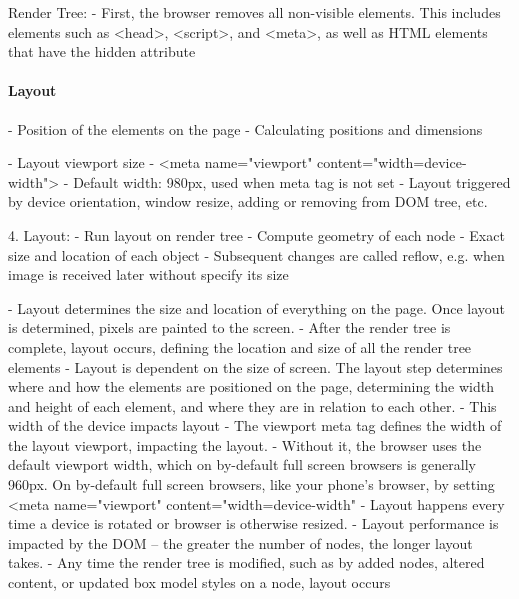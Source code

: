 Render Tree:
- First, the browser removes all non-visible elements. This includes elements such as <head>, <script>, and <meta>, as well as HTML elements that have the hidden attribute










\paragraph{Layout}





- Position of the elements on the page
- Calculating positions and dimensions




- Layout viewport size
- <meta name="viewport" content="width=device-width">
- Default width: 980px, used when meta tag is not set
- Layout triggered by device orientation, window resize, adding or removing from DOM tree, etc.
	

4. Layout:
- Run layout on render tree
- Compute geometry of each node
- Exact size and location of each object
- Subsequent changes are called reflow, e.g. when image is received later without specify its size




- Layout determines the size and location of everything on the page. Once layout is determined, pixels are painted to the screen.
-  After the render tree is complete, layout occurs, defining the location and size of all the render tree elements
- Layout is dependent on the size of screen. The layout step determines where and how the elements are positioned on the page, determining the width and height of each element, and where they are in relation to each other.
- This width of the device impacts layout
- The viewport meta tag defines the width of the layout viewport, impacting the layout.
- Without it, the browser uses the default viewport width, which on by-default full screen browsers is generally 960px. On by-default full screen browsers, like your phone's browser, by setting <meta name="viewport" content="width=device-width"
- Layout happens every time a device is rotated or browser is otherwise resized.
- Layout performance is impacted by the DOM -- the greater the number of nodes, the longer layout takes.
- Any time the render tree is modified, such as by added nodes, altered content, or updated box model styles on a node, layout occurs


